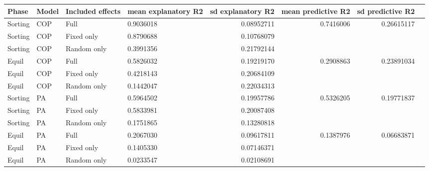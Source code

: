 \begin{table}[ht]
\centering
\begin{tabular}{llllrrrr}
\hline
Phase & Model & Included effects & mean explanatory R2 & sd explanatory R2 & mean predictive R2 & sd predictive R2 \\ 
\hline
Sorting & COP & Full & 0.9036018 & 0.08952711 & 0.7416006 & 0.26615117 \\ 
Sorting & COP & Fixed only & 0.8790688 & 0.10768079 &  &  \\ 
Sorting & COP & Random only & 0.3991356 & 0.21792144 &  &  \\ 
Equil & COP & Full & 0.5826032 & 0.19219170 & 0.2908863 & 0.23891034 \\ 
Equil & COP & Fixed only & 0.4218143 & 0.20684109 &  &  \\ 
Equil & COP & Random only & 0.1442047 & 0.22034313 &  &  \\ 
Sorting & PA & Full & 0.5964502 & 0.19957786 & 0.5326205 & 0.19771837 \\ 
Sorting & PA & Fixed only & 0.5833981 & 0.20087408 &  &  \\ 
Sorting & PA & Random only & 0.1751865 & 0.13280818 &  &  \\ 
Equil & PA & Full & 0.2067030 & 0.09617811 & 0.1387976 & 0.06683871 \\ 
Equil & PA & Fixed only & 0.1405330 & 0.07146371 &  &  \\ 
Equil & PA & Random only & 0.0233547 & 0.02108691 &  &  \\ 
\hline
\end{tabular}
\end{table}

